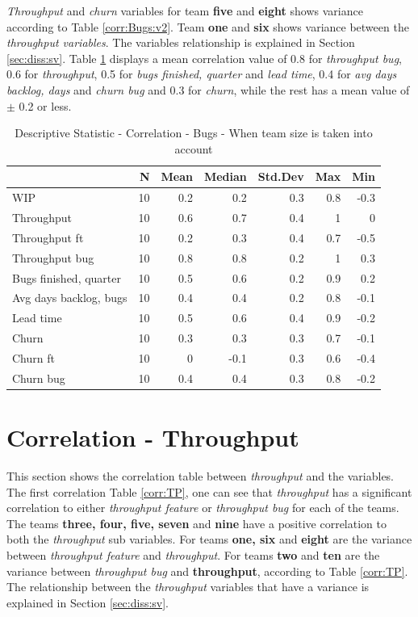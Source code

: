 \documentclass[UKenglish]{ifimaster}  %
\begin{document}
\textit{Throughput} and \textit{churn} variables for team \textbf{five} and \textbf{eight} shows variance according to Table \ref{corr:Bugs:v2}.  Team \textbf{one} and \textbf{six} shows variance between the \textit{throughput variables}. The variables relationship is explained in Section \ref{sec:diss:sv}. Table \ref{DS:corr:Bugs:v2} displays a mean correlation value of 0.8  for \textit{throughput bug}, 0.6 for \textit{throughput}, 0.5 for \textit{bugs finished, quarter} and \textit{lead time}, 0.4 for \textit{avg days backlog, days} and \textit{churn bug} and 0.3 for \textit{churn}, while the rest has a mean value of $\pm$ 0.2 or less.

\FloatBarrier
\begin{table}[H]
 \centering
 \begin{tabular}{ | l | r | r | r | r | r | r | }
 \hline
& \bf{N} & \bf{Mean} & \bf{Median} & \bf{Std.Dev} & \bf{Max} & \bf{Min} \\ \hline
WIP  & 10 & 0.2 & 0.2 & 0.3 & 0.8 & -0.3\\ \hline
Throughput  & 10 & 0.6 & 0.7 & 0.4 & 1 & 0\\ \hline
Throughput ft  & 10 & 0.2 & 0.3 & 0.4 & 0.7 & -0.5\\ \hline
Throughput bug  & 10 & 0.8 & 0.8 & 0.2 & 1 & 0.3\\ \hline
Bugs finished, quarter  & 10 & 0.5 & 0.6 & 0.2 & 0.9 & 0.2\\ \hline
Avg days backlog, bugs  & 10 & 0.4 & 0.4 & 0.2 & 0.8 & -0.1\\ \hline
Lead time & 10 & 0.5 & 0.6 & 0.4 & 0.9 & -0.2\\ \hline
Churn  & 10 & 0.3 & 0.3 & 0.3 & 0.7 & -0.1\\ \hline
Churn ft  & 10 & 0 & -0.1 & 0.3 & 0.6 & -0.4\\ \hline
Churn bug  & 10 & 0.4 & 0.4 & 0.3 & 0.8 & -0.2\\ \hline
\end{tabular}
 \caption{Descriptive Statistic - Correlation - Bugs - When team size is taken into account}
 \label{DS:corr:Bugs:v2}
 \end{table}


\section {Correlation - Throughput}
\label{sec:corr:TP}
This section shows the correlation table between \textit{throughput} and the variables. The first correlation Table \ref{corr:TP}, one can see that \textit{throughput} has a significant correlation to either \textit{throughput feature} or \textit{throughput bug} for each of the teams. The teams \textbf{three, four, five, seven} and \textbf{nine} have a positive correlation to both the \textit{throughput} sub variables. For teams \textbf{one, six} and \textbf{eight} are the variance between \textit{throughput feature} and \textit{throughput}.  For teams \textbf{two} and \textbf{ten} are the variance between \textit{throughput bug} and \textbf{throughput}, according to Table \ref{corr:TP}. The relationship between the \textit{throughput} variables that have a variance is explained in Section \ref{sec:diss:sv}.
\end{document}
